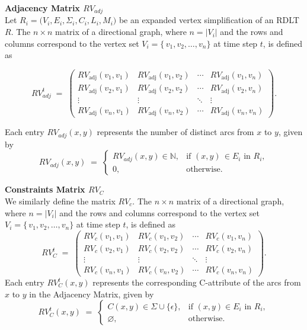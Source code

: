 \begin{defn} \textbf{Adjacency Matrix $RV_{adj}$} \\
Let $R_i = \bigl(V_i, E_i,\Sigma_i, C_i, L_i, M_i\bigr)$ be an expanded vertex simplification of an RDLT $R$. The $n \times n$ matrix of a directional graph, where $n = |V_i|$ and the rows and columns correspond to the vertex set $V_i = \{\,v_1, v_2, \ldots, v_n\}$ at time step $t$, is defined as

\[
  RV_{adj}^{t} \;=\;
  \begin{pmatrix}
    RV_{\mathrm{adj}}(v_1,v_1) & RV_{\mathrm{adj}}(v_1,v_2) & \cdots & RV_{\mathrm{adj}}(v_1,v_n) \\[6pt]
    RV_{\mathrm{adj}}(v_2,v_1) & RV_{\mathrm{adj}}(v_2,v_2) & \cdots & RV_{\mathrm{adj}}(v_2,v_n) \\[6pt]
    \vdots                    & \vdots                    & \ddots & \vdots                    \\[6pt]
    RV_{\mathrm{adj}}(v_n,v_1) & RV_{\mathrm{adj}}(v_n,v_2) & \cdots & RV_{\mathrm{adj}}(v_n,v_n)
  \end{pmatrix}.
\]

Each entry $RV_{adj}(x,y)$ represents the number of distinct arcs from $x$ to $y$, given by
\[
  RV_{adj}(x,y) \;=\;
  \begin{cases}
    RV_{adj}(x,y) \in \mathbb{N}, & \text{if } (x,y)\,\in E_i \text{ in } R_i, \\[5pt]
    0,     & \text{otherwise}.
  \end{cases}
\]
\end{defn}

\begin{defn} \textbf{Constraints Matrix $RV_C$} \\
We similarly define the matrix $RV_c$. The $n \times n$ matrix of a directional graph, where $n = |V_i|$ and the rows and columns correspond to the vertex set $V_i = \{\,v_1, v_2, \ldots, v_n\}$ at time step $t$, is defined as
\[
   RV_{C}^{t} \;=\;
  \begin{pmatrix}
    RV_c(v_1,v_1) & RV_c(v_1,v_2) & \cdots & RV_c(v_1,v_n) \\[6pt]
    RV_c(v_2,v_1) & RV_c(v_2,v_2) & \cdots & RV_c(v_2,v_n) \\[6pt]
    \vdots        & \vdots        & \ddots & \vdots        \\[6pt]
    RV_c(v_n,v_1) & RV_c(v_n,v_2) & \cdots & RV_c(v_n,v_n)
  \end{pmatrix}.
\]
Each entry $RV_{C}^{t}(x,y)$ represents the corresponding C-attribute of the arcs from $x$ to $y$ in the Adjacency Matrix, given by
\[
  RV_{C}^{t}(x,y) \;=\;
  \begin{cases}
    C(x,y)\in \Sigma \cup \{\epsilon\}, & \text{if } (x,y)\in E_i \text{ in } R_i,\\[5pt]
    \varnothing,                                  & \text{otherwise}.
  \end{cases}
\]
\end{defn}


